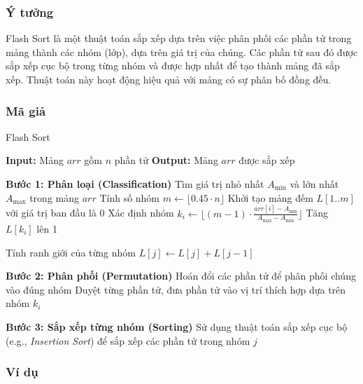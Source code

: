 \subsubsection{Ý tưởng}
Flash Sort là một thuật toán sắp xếp dựa trên việc phân phối các phần tử trong mảng thành các nhóm (lớp), dựa trên giá trị của chúng. Các phần tử sau đó được sắp xếp cục bộ trong từng nhóm và được hợp nhất để tạo thành mảng đã sắp xếp. Thuật toán này hoạt động hiệu quả với mảng có sự phân bố đồng đều. \cite{flashsort1}

\subsubsection{Mã giả}

\begin{algorithm}[H]
\caption{Flash Sort}
\begin{algorithmic}[1]
    \State \textbf{Input:} Mảng $arr$ gồm $n$ phần tử
    \State \textbf{Output:} Mảng $arr$ được sắp xếp
    
    \State \textbf{Bước 1: Phân loại (Classification)}
    \State Tìm giá trị nhỏ nhất $A_{\text{min}}$ và lớn nhất $A_{\text{max}}$ trong mảng $arr$
    \State Tính số nhóm $m \gets \lfloor 0.45 \cdot n \rfloor$
    \State Khởi tạo mảng đếm $L[1..m]$ với giá trị ban đầu là 0
        \State Xác định nhóm $k_i \gets \lfloor (m - 1) \cdot \frac{arr[i] - A_{\text{min}}}{A_{\text{max}} - A_{\text{min}}} \rfloor$
        \State Tăng $L[k_i]$ lên 1
    \EndFor
    
    \State Tính ranh giới của từng nhóm
        \State $L[j] \gets L[j] + L[j-1]$
    \EndFor
    
    \State \textbf{Bước 2: Phân phối (Permutation)}
    \State Hoán đổi các phần tử để phân phối chúng vào đúng nhóm
    \State Duyệt từng phần tử, đưa phần tử vào vị trí thích hợp dựa trên nhóm $k_i$
    
    \State \textbf{Bước 3: Sắp xếp từng nhóm (Sorting)}
        \State Sử dụng thuật toán sắp xếp cục bộ (e.g., \textit{Insertion Sort}) để sắp xếp các phần tử trong nhóm $j$
    \EndFor
\EndProcedure
\end{algorithmic}
\end{algorithm}

\subsubsection{Ví dụ}

